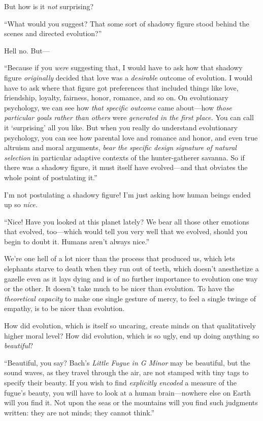  But how is it \textit{not} surprising?


 ``What would you suggest? That some sort of
shadowy figure stood behind the scenes and directed
evolution?''


 Hell no. But---


 ``Because if you \textit{were} suggesting that, I
would have to ask how that shadowy figure \textit{originally} decided
that love was a \textit{desirable} outcome of evolution. I would have
to ask where that figure got preferences that included things like
love, friendship, loyalty, fairness, honor, romance, and so on. On
evolutionary psychology, we can see how \textit{that specific outcome}
came about---how \textit{those particular goals rather than others}
were \textit{generated in the first place.} You can call it
`surprising' all you like. But when you
really do understand evolutionary psychology, you can see how parental
love and romance and honor, and even true altruism and moral arguments,
\textit{bear the specific design signature of natural selection} in
particular adaptive contexts of the hunter-gatherer savanna. So if
there was a shadowy figure, it must itself have evolved---and that
obviates the whole point of postulating it.''


 I'm not postulating a shadowy figure!
I'm just asking how human beings ended up so
\textit{nice.}


 ``Nice! Have you looked at this planet lately? We
bear all those other emotions that evolved, too---which would tell you
very well that we evolved, should you begin to doubt it. Humans
aren't always nice.''


 We're one hell of a lot nicer than the process
that produced us, which lets elephants starve to death when they run
out of teeth, which doesn't anesthetize a gazelle even
as it lays dying and is of no further importance to evolution one way
or the other. It doesn't take much to be nicer than
evolution. To have the \textit{theoretical capacity} to make one single
gesture of mercy, to feel a single twinge of empathy, is to be nicer
than evolution.


 How did evolution, which is itself so uncaring, create minds on
that qualitatively higher moral level? How did evolution, which is so
ugly, end up doing anything so \textit{beautiful}?


 ``Beautiful, you say? Bach's
\textit{Little Fugue in G Minor} may be beautiful, but the sound waves,
as they travel through the air, are not stamped with tiny tags to
specify their beauty. If you wish to find \textit{explicitly encoded} a
measure of the fugue's beauty, you will have to look at
a human brain---nowhere else on Earth will you find it. Not upon
the seas or the mountains will you find such judgments written: they
are not minds; they cannot think.''


